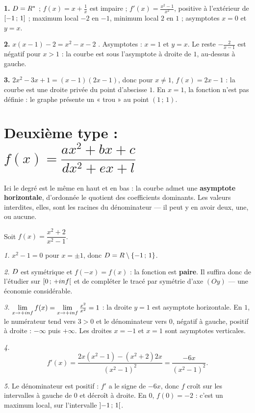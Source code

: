 \begin{corrige}
\textbf{1.} $D = R^{*}$ ; $f(x) = x+\frac1x$ est impaire ;
$f' (x)= \frac{x^{2}-1}{x^{2}}$, positive à l'extérieur de
$\left[-1\,;\,1\right]$ ; maximum local $-2$ en $-1$, minimum local $2$ en
$1$ ; asymptotes $x = 0$ et $y = x$.

\textbf{2.} $x(x-1)-2 = x^{2}-x-2$ \checkmark. Asymptotes : $x = 1$ et
$y = x$. Le reste $-\frac{2}{x-1}$ est négatif pour $x>1$ : la courbe est
sous l'asymptote à droite de $1$, au-dessus à gauche.

\textbf{3.} $2x^{2}-3x+1 = (x-1)(2x-1)$, donc pour $x \neq 1$,
$f(x) = 2x-1$ : la courbe est une droite privée du point d'abscisse $1$. En
$x = 1$, la fonction n'est pas définie : le graphe présente un « trou » au
point $(1\,;\,1)$.
\end{corrige}

\section{Deuxième type : \texorpdfstring{$f(x) = \dfrac{ax^{2}+bx+c}{dx^{2}+ex+l}$}{quotient de deux polynomes de degre 2}}

Ici le degré est le même en haut et en bas : la courbe admet une
\textbf{asymptote horizontale}, d'ordonnée le quotient des coefficients
dominants. Les valeurs interdites, elles, sont les racines du dénominateur —
il peut y en avoir deux, une, ou aucune.

\begin{exemple}
Soit $f(x) = \dfrac{x^{2}+2}{x^{2}-1}$.

\emph{1.} $x^{2}-1 = 0$ pour $x = \pm1$, donc
$D = R\setminus\{-1\,;\,1\}$.

\emph{2.} $D$ est symétrique et $f(-x) = f(x)$ : la fonction est
\textbf{paire}. Il suffira donc de l'étudier sur $\left[0\,;\,+inf\right[$
et de compléter le tracé par symétrie d'axe $(Oy)$ — une économie
considérable.

\emph{3.} $\limpinf f(x) = \limpinf \frac{x^{2}}{x^{2}} = 1$ : la droite
$y = 1$ est asymptote horizontale. En $1$, le numérateur tend vers $3>0$ et
le dénominateur vers $0$, négatif à gauche, positif à droite : $-\infty$ puis
$+\infty$. Les droites $x = -1$ et $x = 1$ sont asymptotes verticales.

\emph{4.}
\[
  f'(x) = \frac{2x\left(x^{2}-1\right)-\left(x^{2}+2\right)2x}
               {\left(x^{2}-1\right)^{2}}
        = \frac{-6x}{\left(x^{2}-1\right)^{2}} .
\]

\emph{5.} Le dénominateur est positif : $f'$ a le signe de $-6x$, donc $f$
croît sur les intervalles à gauche de $0$ et décroît à droite. En $0$,
$f(0) = -2$ : c'est un maximum local, sur l'intervalle
$\left]-1\,;\,1\right[$.
\end{exemple}

